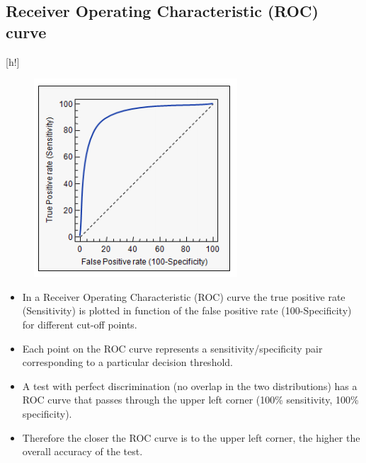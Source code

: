 \documentclass[]{report}
\begin{document}
\subsection*{Receiver Operating Characteristic (ROC) curve}[h!]
\begin{figure}
	\centering
	\includegraphics[width=0.55\linewidth]{ROCcurve}
	\caption{}
	\label{fig:roccurve}
\end{figure}
\begin{itemize}
	\item In a Receiver Operating Characteristic (ROC) curve the true positive rate
	(Sensitivity) is plotted in function of the false positive rate (100-Specificity)
	for different cut-off points. 
	\item Each point on the ROC curve represents a sensitivity/specificity
	pair corresponding to a particular decision threshold. 
	\item A
	test with perfect discrimination (no overlap in the two distributions) has a
	ROC curve that passes through the upper left corner (100\% sensitivity, 100\%
	specificity). 
	\item Therefore the closer the ROC curve is to the upper left corner,
	the higher the overall accuracy of the test. %
\end{itemize}
\end{document}
